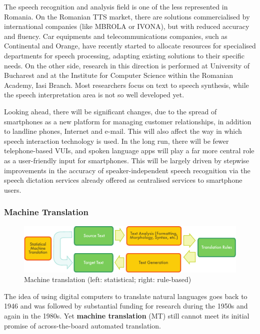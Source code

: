 \begin{multicols}{2}
The speech recognition and analysis field is one of the less represented in Romania. On the Romanian TTS market, there are solutions commercialised by international companies (like MBROLA or IVONA), but with reduced accuracy and fluency. Car equipments and telecommunications companies, such as Continental and Orange, have recently started to allocate resources for specialised departments for speech processing, adapting existing solutions to their specific needs. On the other side, research in this direction is performed at University of Bucharest and at the Institute for Computer Science within the Romanian Academy, Iasi Branch. Most researchers focus on text to speech synthesis, while the speech interpretation area is not so well developed yet. 

Looking ahead, there will be significant changes, due to the spread of smartphones as a new platform for managing customer relationships, in addition to landline phones, Internet and e-mail. This will also affect the way in which speech interaction technology is used. In the long run, there will be fewer telephone-based VUIs, and spoken language apps will play a far more central role as a user-friendly input for smartphones. This will be largely driven by stepwise improvements in the accuracy of speaker-independent speech recognition via the speech dictation services already offered as centralised services to smartphone users.

\subsubsection{Machine Translation}

\begin{figure}[htb]
  \center
  \includegraphics[width=\textwidth]{../_media/english/machine_translation}
  \caption{Machine translation (left: statistical; right: rule-based)}
  \label{fig:mtarch_en}
  \vspace{-15mm}
\end{figure}

The idea of using digital computers to translate natural languages goes back to 1946 and was followed by substantial funding for research during the 1950s and again in the 1980s. Yet \textbf{machine translation} (MT) still cannot meet its initial promise of across-the-board automated translation. 


\end{multicols}
